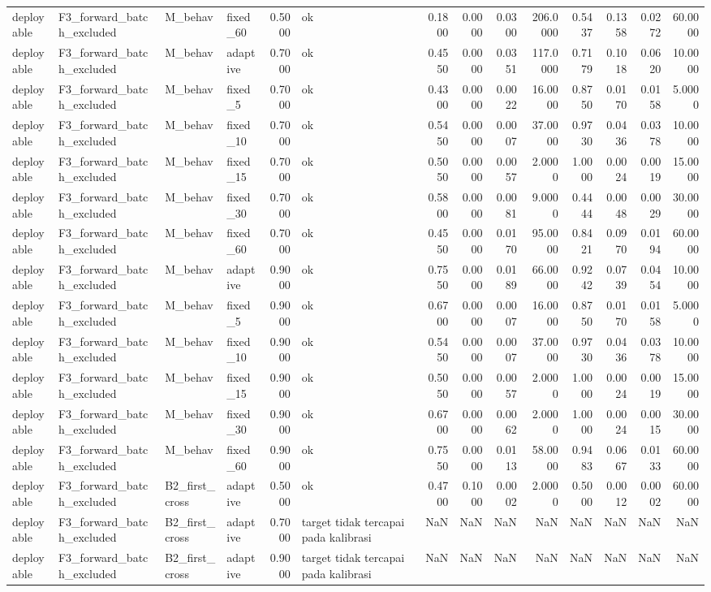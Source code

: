 \begin{table}
\begin{tabular}{llllrlrrrrrrrr}
deployable & F3\_forward\_batch\_excluded & M\_behav & fixed\_60 & 0.5000 & ok & 0.1800 & 0.0000 & 0.0300 & 206.0000 & 0.5437 & 0.1358 & 0.0272 & 60.0000 \\
deployable & F3\_forward\_batch\_excluded & M\_behav & adaptive & 0.7000 & ok & 0.4550 & 0.0000 & 0.0351 & 117.0000 & 0.7179 & 0.1018 & 0.0620 & 10.0000 \\
deployable & F3\_forward\_batch\_excluded & M\_behav & fixed\_5 & 0.7000 & ok & 0.4300 & 0.0000 & 0.0022 & 16.0000 & 0.8750 & 0.0170 & 0.0158 & 5.0000 \\
deployable & F3\_forward\_batch\_excluded & M\_behav & fixed\_10 & 0.7000 & ok & 0.5450 & 0.0000 & 0.0007 & 37.0000 & 0.9730 & 0.0436 & 0.0378 & 10.0000 \\
deployable & F3\_forward\_batch\_excluded & M\_behav & fixed\_15 & 0.7000 & ok & 0.5050 & 0.0000 & 0.0057 & 2.0000 & 1.0000 & 0.0024 & 0.0019 & 15.0000 \\
deployable & F3\_forward\_batch\_excluded & M\_behav & fixed\_30 & 0.7000 & ok & 0.5800 & 0.0000 & 0.0081 & 9.0000 & 0.4444 & 0.0048 & 0.0029 & 30.0000 \\
deployable & F3\_forward\_batch\_excluded & M\_behav & fixed\_60 & 0.7000 & ok & 0.4550 & 0.0000 & 0.0170 & 95.0000 & 0.8421 & 0.0970 & 0.0194 & 60.0000 \\
deployable & F3\_forward\_batch\_excluded & M\_behav & adaptive & 0.9000 & ok & 0.7550 & 0.0000 & 0.0189 & 66.0000 & 0.9242 & 0.0739 & 0.0454 & 10.0000 \\
deployable & F3\_forward\_batch\_excluded & M\_behav & fixed\_5 & 0.9000 & ok & 0.6700 & 0.0000 & 0.0007 & 16.0000 & 0.8750 & 0.0170 & 0.0158 & 5.0000 \\
deployable & F3\_forward\_batch\_excluded & M\_behav & fixed\_10 & 0.9000 & ok & 0.5450 & 0.0000 & 0.0007 & 37.0000 & 0.9730 & 0.0436 & 0.0378 & 10.0000 \\
deployable & F3\_forward\_batch\_excluded & M\_behav & fixed\_15 & 0.9000 & ok & 0.5050 & 0.0000 & 0.0057 & 2.0000 & 1.0000 & 0.0024 & 0.0019 & 15.0000 \\
deployable & F3\_forward\_batch\_excluded & M\_behav & fixed\_30 & 0.9000 & ok & 0.6700 & 0.0000 & 0.0062 & 2.0000 & 1.0000 & 0.0024 & 0.0015 & 30.0000 \\
deployable & F3\_forward\_batch\_excluded & M\_behav & fixed\_60 & 0.9000 & ok & 0.7550 & 0.0000 & 0.0113 & 58.0000 & 0.9483 & 0.0667 & 0.0133 & 60.0000 \\
deployable & F3\_forward\_batch\_excluded & B2\_first\_cross & adaptive & 0.5000 & ok & 0.4700 & 0.1000 & 0.0002 & 2.0000 & 0.5000 & 0.0012 & 0.0002 & 60.0000 \\
deployable & F3\_forward\_batch\_excluded & B2\_first\_cross & adaptive & 0.7000 & target tidak tercapai pada kalibrasi & NaN & NaN & NaN & NaN & NaN & NaN & NaN & NaN \\
deployable & F3\_forward\_batch\_excluded & B2\_first\_cross & adaptive & 0.9000 & target tidak tercapai pada kalibrasi & NaN & NaN & NaN & NaN & NaN & NaN & NaN & NaN \\
\bottomrule
\end{tabular}
\end{table}
